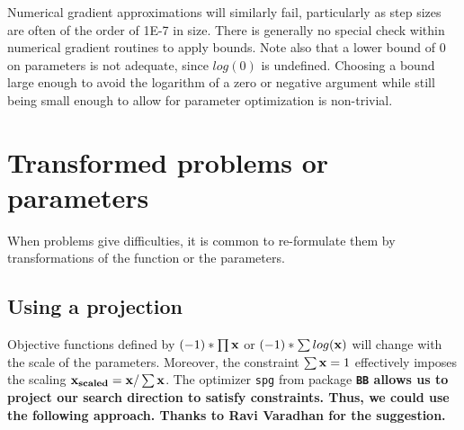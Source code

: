 \documentclass[11pt]{article}\usepackage[]{graphicx}\usepackage[]{color}
\newcommand{\B}[1]{{\bf #1 \rm}}
\newcommand{\code}[1]{{\tt#1}}
\newcommand{\pkg}[1]{\bf{\tt#1}\rm }
\begin{document}
Numerical gradient approximations will similarly fail, 
particularly as step sizes are often of the order
of 1E-7 in size. There is generally no special check within numerical 
gradient routines to apply bounds. 
Note also that a lower bound of 0 on parameters is not adequate, 
since $log(0)$ is undefined. Choosing a
bound large enough to avoid the logarithm of a zero or negative argument 
while still being small enough 
to allow for parameter optimization is non-trivial.



\section{Transformed problems or parameters}

When problems give difficulties, it is common to re-formulate them by transformations of the function
or the parameters. 

\subsection{Using a projection}

Objective functions defined by $(-1)*\prod{\B{x}}$ or $(-1)*\sum{log(\B{x})}$ will change 
with the scale of the parameters. Moreover, the constraint $\sum{\B{x}}=1$ 
effectively imposes the scaling $\B{x_{scaled}} = \B{x}/\sum{\B{x}}$. The 
optimizer \code{spg} from package \pkg{BB} allows us to project our search 
direction to satisfy constraints. Thus, we could use the following approach. Thanks
to Ravi Varadhan for the suggestion.
\end{document}
